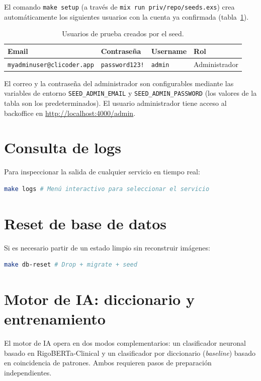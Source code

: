 El comando \texttt{make setup} (a través de \texttt{mix run priv/repo/seeds.exs}) crea automáticamente los siguientes usuarios con la cuenta ya confirmada (tabla~\ref{tab:seeds}).

\begin{table}[h]
\centering
\caption{Usuarios de prueba creados por el seed.}
\label{tab:seeds}
\begin{tabular}{llll}
\hline
\textbf{Email} & \textbf{Contraseña} & \textbf{Username} & \textbf{Rol} \\
\hline
\texttt{myadminuser@clicoder.app} & \texttt{password123!} & \texttt{admin} & Administrador \\
\hline
\end{tabular}
\end{table}

El correo y la contraseña del administrador son configurables mediante las variables de entorno \texttt{SEED\_ADMIN\_EMAIL} y \texttt{SEED\_ADMIN\_PASSWORD} (los valores de la tabla son los predeterminados). El usuario administrador tiene acceso al backoffice en \url{http://localhost:4000/admin}.

\section{Consulta de logs}

Para inspeccionar la salida de cualquier servicio en tiempo real:

\begin{lstlisting}[language=bash]
make logs # Menú interactivo para seleccionar el servicio
\end{lstlisting}

\section{Reset de base de datos}

Si es necesario partir de un estado limpio sin reconstruir imágenes:

\begin{lstlisting}[language=bash]
make db-reset # Drop + migrate + seed
\end{lstlisting}

\section{Motor de IA: diccionario y entrenamiento}

El motor de IA opera en dos modos complementarios: un clasificador neuronal basado en RigoBERTa-Clinical y un clasificador por diccionario (\emph{baseline}) basado en coincidencia de patrones. Ambos requieren pasos de preparación independientes.


